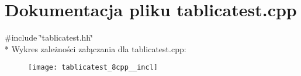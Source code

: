 \section{Dokumentacja pliku tablicatest.\+cpp}
\label{tablicatest_8cpp}
{\ttfamily \#include \char`\"{}tablicatest.\+hh\char`\"{}}\\*
Wykres zależności załączania dla tablicatest.\+cpp\+:\nopagebreak
\begin{figure}[H]
\begin{center}
\leavevmode
\texttt{[image: tablicatest\_8cpp\_\_incl]}
\end{center}
\end{figure}
